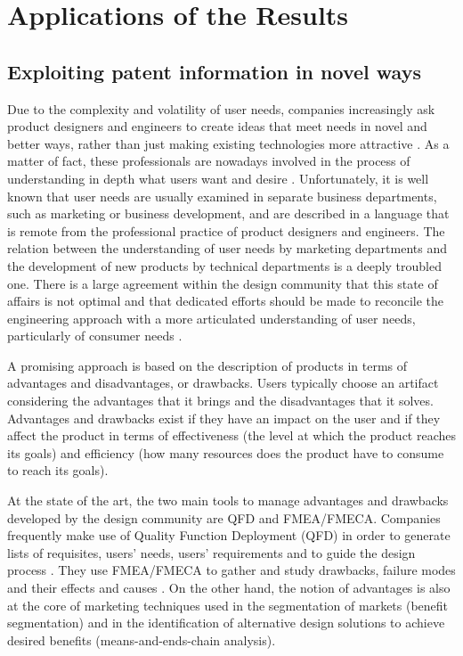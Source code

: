 \documentclass[]{book}
\begin{document}
\part{Applications of the
Results}\label{part-applications-of-the-results}

\chapter{Exploiting patent information in novel
ways}\label{exploiting-patent-information-in-novel-ways}

Due to the complexity and volatility of user needs, companies
increasingly ask product designers and engineers to create ideas that
meet needs in novel and better ways, rather than just making existing
technologies more attractive \citep{brown2010design}. As a matter of
fact, these professionals are nowadays involved in the process of
understanding in depth what users want and desire
\citep{haley1968benefit, day1979customer}. Unfortunately, it is well
known that user needs are usually examined in separate business
departments, such as marketing or business development, and are
described in a language that is remote from the professional practice of
product designers and engineers. The relation between the understanding
of user needs by marketing departments and the development of new
products by technical departments is a deeply troubled one. There is a
large agreement within the design community that this state of affairs
is not optimal and that dedicated efforts should be made to reconcile
the engineering approach with a more articulated understanding of user
needs, particularly of consumer needs
\citep{pahl2013engineering, eppinger1995product}.

A promising approach is based on the description of products in terms of
advantages and disadvantages, or drawbacks. Users typically choose an
artifact considering the advantages that it brings and the disadvantages
that it solves. Advantages and drawbacks exist if they have an impact on
the user and if they affect the product in terms of effectiveness (the
level at which the product reaches its goals) and efficiency (how many
resources does the product have to consume to reach its goals).

At the state of the art, the two main tools to manage advantages and
drawbacks developed by the design community are QFD and FMEA/FMECA.
Companies frequently make use of Quality Function Deployment (QFD) in
order to generate lists of requisites, users' needs, users' requirements
and to guide the design process \citep{carnevalli2008review}. They use
FMEA/FMECA to gather and study drawbacks, failure modes and their
effects and causes \citep{liu2013risk}. On the other hand, the notion of
advantages is also at the core of marketing techniques used in the
segmentation of markets (benefit segmentation) and in the identification
of alternative design solutions to achieve desired benefits
(means-and-ends-chain analysis).
\end{document}

